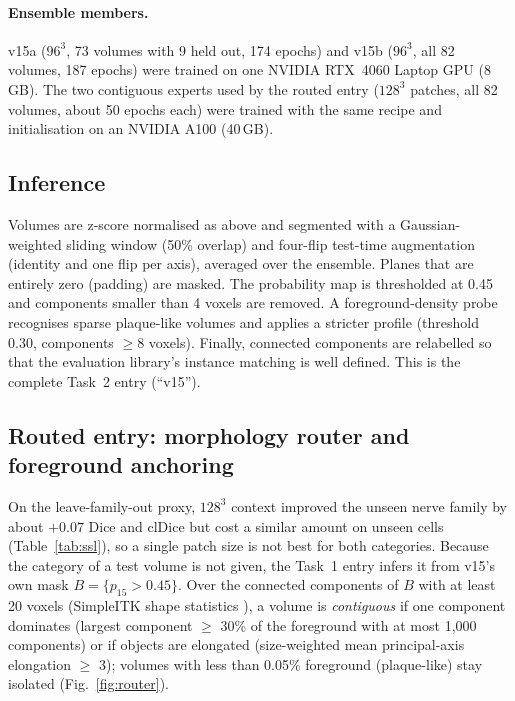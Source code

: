 \documentclass[11pt,a4paper]{article}
\begin{document}
\paragraph{Ensemble members.} v15a ($96^3$, 73 volumes with 9 held out, 174 epochs) and v15b ($96^3$, all 82 volumes, 187 epochs) were trained on one NVIDIA RTX~4060 Laptop GPU (8\,GB). The two contiguous experts used by the routed entry ($128^3$ patches, all 82 volumes, about 50 epochs each) were trained with the same recipe and initialisation on an NVIDIA A100 (40\,GB).

\subsection{Inference}
Volumes are z-score normalised as above and segmented with a Gaussian-weighted sliding window (50\% overlap) and four-flip test-time augmentation (identity and one flip per axis), averaged over the ensemble. Planes that are entirely zero (padding) are masked. The probability map is thresholded at 0.45 and components smaller than 4 voxels are removed. A foreground-density probe recognises sparse plaque-like volumes and applies a stricter profile (threshold 0.30, components $\geq 8$ voxels). Finally, connected components are relabelled so that the evaluation library's instance matching is well defined. This is the complete Task~2 entry (``v15'').

\subsection{Routed entry: morphology router and foreground anchoring}
\label{sec:routing}
On the leave-family-out proxy, $128^3$ context improved the unseen nerve family by about $+0.07$ Dice and clDice but cost a similar amount on unseen cells (Table~\ref{tab:ssl}), so a single patch size is not best for both categories. Because the category of a test volume is not given, the Task~1 entry infers it from v15's own mask $B=\{p_{15}>0.45\}$. Over the connected components of $B$ with at least 20 voxels (SimpleITK shape statistics \cite{lowekamp2013simpleitk}), a volume is \emph{contiguous} if one component dominates (largest component $\geq$ 30\% of the foreground with at most 1,000 components) or if objects are elongated (size-weighted mean principal-axis elongation $\geq$ 3); volumes with less than 0.05\% foreground (plaque-like) stay isolated (Fig.~\ref{fig:router}).
\end{document}

